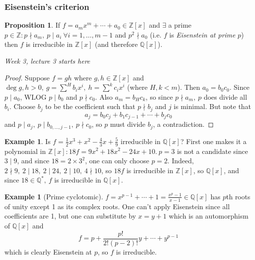 \documentclass[a4paper]{article}
\newcommand{\Z}{\mathbb Z}
\newcommand{\Q}{\mathbb Q}
\theoremstyle{definition}
\newtheorem{prop}[defn]{Proposition}
\newtheorem{example}[defn]{Example}
\begin{document}
\subsubsection{Eisenstein's criterion}
\begin{prop}
If $f=a_m x^m+\cdots+a_0\in\Z[x]$ and $\exists$ a prime $p\in\Z:p\nmid a_m,\ p\mid a_i \ \forall i=1,\ldots,m-1$ and $p^2\nmid a_0$ (i.e. $f$ is \textit{Eisenstein at prime} $p$) then $f$ is irreducible in $\Z[x]$ (and therefore $\Q[x]$).
\end{prop}

\begin{flushright}
\textit{Week 3, lecture 3 starts here}
\end{flushright}

\begin{proof}
Suppose $f=gh$ where $g,h\in\Z[x]$ and $\deg g,h>0,\ g=\sum^H b_i x^i,\ h=\sum^k c_i x^i$ (where $H,k<m$). Then $a_0=b_0c_0$. Since $p\mid a_0$, WLOG $p\mid b_0$ and $p\nmid c_0$. Also $a_m=b_Hc_k$, so since $p\nmid a_m,\ p$ does divide all $b_i$. Choose $b_j$ to be the coefficient such that $p\nmid b_j$ and $j$ is minimal. But note that
\[
a_j=b_0c_j+b_1c_{j-1}+\cdots+b_jc_0
\]
and $p\mid a_j,\ p\mid b_{0,\ldots,j-1},\ p\nmid c_0$, so $p$ must divide $b_j$, a contradiction.
\end{proof}

\begin{example}
Is $f=\frac12 x^3+x^2-\frac43 x+\frac59$ irreducible in $\Q[x]$? First one makes it a polynomial in $\Z[x]: 18f=9x^2+18x^2-24x+10.\ p=3$ is not a candidate since $3\mid 9$, and since $18=2\times 3^2$, one can only choose $p=2$. Indeed, $2\nmid 9,\ 2\mid 18,\ 2\mid 24,\ 2\mid 10,\ 4\nmid 10$, so $18f$ is irreducible in $\Z[x]$, so $\Q[x]$, and since $18\in\Q^\ast,\ f$ is irreducible in $\Q[x]$.
\end{example}

\begin{example}[Prime cyclotomic]
$f=x^{p-1}+\cdots+1=\frac{x^p-1}{x-1} \in\Q[x]$ has $p$th roots of unity except 1 as its complex roots. One can't apply Eisenstein since all coefficients are 1, but one can substitute by $x=y+1$ which is an automorphism of $\Q[x]$ and
\[
f=p+\frac{p!}{2!(p-2)!}y+\cdots+y^{p-1}
\]
which is clearly Eisenstein at $p$, so $f$ is irreducible.
\end{example}
\end{document}
